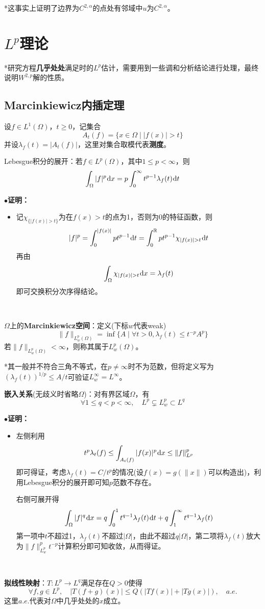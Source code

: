 \documentclass[a4paper,UTF8,fontset=windows,AutoFakeBold]{ctexart}
\newcommand*{\dr}{\hspace{0.07em}\mathrm{d}}
\newcommand{\proo}[1]{{\kaishu $\bullet$\textbf{证明：}
\begin{itemize}
    \item[] #1
\end{itemize}
}}
\begin{document}
*这事实上证明了边界为$C^{2,\alpha}$的点处有邻域中$u$为$C^{2,\alpha}$。

\section{$L^p$理论}
*研究方程\textbf{几乎处处}满足时的$L^p$估计，需要用到一些调和分析结论进行处理，最终说明$W^{2,p}$解的性质。

\subsection{Marcinkiewicz内插定理}
设$f\in L^1(\Omega)$，$t\ge0$，记集合
$$A_t(f)=\{x\in\Omega\mid|f(x)|>t\}$$
并设$\lambda_f(t)=|A_t(f)|$，这里对集合取模代表\textbf{测度}。

Lebesgue积分的展开：若$f\in L^p(\Omega)$，其中$1\le p<\infty$，则
$$\int_\Omega|f|^p\dr x=p\int_0^\infty t^{p-1}\lambda_f(t)\dr t$$
\proo{
    记$\chi_{\{|f(x)|>t\}}$为在$f(x)>t$的点为1，否则为0的特征函数，则
    $$|f|^p=\int_0^{|f(x)|}pt^{p-1}\dr t=\int_0^\mathbb{R}pt^{p-1}\chi_{|f(x)|>t}\dr t$$
    再由
    $$\int_\Omega\chi_{|f(x)|>t}\dr x=\lambda_f(t)$$
    即可交换积分次序得结论。
}

\

$\Omega$上的\textbf{Marcinkiewicz空间}：定义(下标$w$代表weak)
$$\|f\|_{L_w^p(\Omega)}=\inf\{A\mid\forall t>0,\lambda_f(t)\le t^{-p}A^p\}$$
若$\|f\|_{L_w^p(\Omega)}<\infty$，则称其属于$L_w^p(\Omega)$。

*其一般并不符合三角不等式，在$p\ne\infty$时不为范数，但将定义写为$(\lambda_f(t))^{1/p}\le A/t$可验证$L_w^\infty=L^\infty$。

\textbf{嵌入关系}(无歧义时省略$\Omega$)：对有界区域$\Omega$，有
$$\forall 1\le q<p<\infty,\quad L^p\subsetneq L_w^p\subset L^q$$
\proo{
    左侧利用
    $$t^p\lambda_t(f)\le\int_{A_t(f)}|f(x)|^p\dr x\le\|f\|_{L^p}^p$$
    即可得证，考虑$\lambda_f(t)=C/t^p$的情况(设$f(x)=g(\|x\|)$可以构造出)，利用Lebesgue积分的展开即可知$p$范数不存在。

    右侧可展开得
    $$\int_\Omega|f|^q\dr x=q\int_0^1t^{q-1}\lambda_f(t)\dr t+q\int_1^\infty t^{q-1}\lambda_f(t)$$
    第一项中$t$不超过1，$\lambda_f(t)$不超过$|\Omega|$，由此不超过$q|\Omega|$，第二项将$\lambda_f(t)$放大为$\|f\|_{L^p_w}^pt^{-p}$计算积分即可知收敛，从而得证。

}

\

\textbf{拟线性映射}：$T:L^p\to L^q$满足存在$Q>0$使得
$$\forall f,g\in L^p,\quad|T(f+g)(x)|\le Q(|Tf(x)|+|Tg(x)|),\quad a.e.$$
这里$a.e.$代表对$\Omega$中几乎处处的$x$成立。
\end{document}

